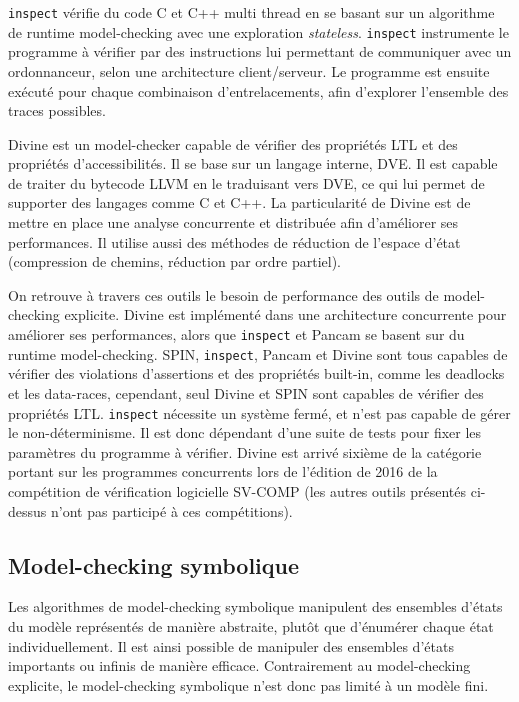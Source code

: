 \texttt{inspect}\cite{inspect} vérifie du code C et C++
multi thread en se basant sur un algorithme de runtime model-checking
avec une exploration \emph{stateless}. \texttt{inspect} instrumente
le programme à vérifier par des instructions lui permettant de
communiquer avec un ordonnanceur, selon une architecture client/serveur.
Le programme est ensuite exécuté pour chaque combinaison d'entrelacements,
afin d'explorer l'ensemble des traces possibles.

Divine\cite{Divine_3_0} est un model-checker capable de vérifier des
propriétés \ac{LTL} et des propriétés d'accessibilités. Il se base sur un
langage interne, DVE. Il est capable de traiter du bytecode LLVM en le
traduisant vers DVE, ce qui lui permet de supporter des langages comme C
et C++. La particularité de Divine est de mettre en place une analyse
concurrente et distribuée afin d'améliorer ses performances. Il utilise
aussi des méthodes de réduction de l'espace d'état (compression de
chemins, réduction par ordre partiel).

On retrouve à travers ces outils le besoin de performance des outils de
model-checking explicite. Divine est implémenté dans une architecture
concurrente pour améliorer ses performances, alors que \texttt{inspect} et
Pancam se basent sur du runtime model-checking. SPIN, \texttt{inspect}, Pancam
et Divine sont tous capables de vérifier des violations d'assertions et des
propriétés built-in, comme les deadlocks et les data-races, cependant, seul
Divine et SPIN sont capables de vérifier des propriétés \ac{LTL}.
\texttt{inspect} nécessite un système fermé, et n'est pas capable de gérer le
non-déterminisme. Il est donc dépendant d'une suite de tests pour fixer les
paramètres du programme à vérifier. Divine est arrivé sixième de la catégorie
portant sur les programmes concurrents lors de l'édition de 2016 de la
compétition de vérification logicielle SV-COMP\citep{svcomp_2016_result} (les
autres outils présentés ci-dessus n'ont pas participé à ces compétitions).

\subsection{Model-checking symbolique}

Les algorithmes de model-checking symbolique manipulent des ensembles d'états
du modèle représentés de manière abstraite, plutôt que d'énumérer chaque état
individuellement. Il est ainsi possible de manipuler des ensembles
d'états importants ou infinis de manière efficace. Contrairement au
model-checking explicite, le model-checking symbolique n'est donc pas limité à
un modèle fini.


